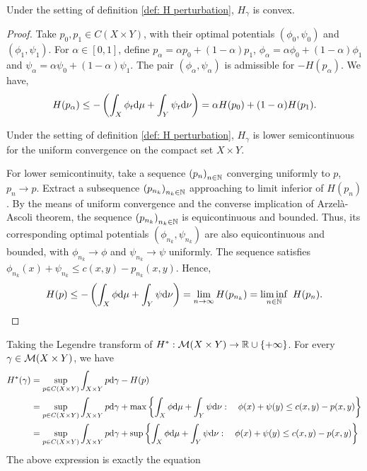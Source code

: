 \begin{lemma}
	Under the setting of definition \ref{def: H perturbation}, $H_\gamma$ is convex.
\end{lemma}
\begin{proof}
	Take $p_0, p_1 \in C(X\times Y)$,  with their optimal potentials $(\phi_0, \psi_0)$ and $(\phi_1, \psi_1)$. For $\alpha\in[0,1]$, define $p_\alpha=\alpha p_0+(1-\alpha)p_1$, $\phi_\alpha=\alpha \phi_0+(1-\alpha)\phi_1$ and $\psi_\alpha=\alpha \psi_0+(1-\alpha)\psi_1$. The pair $(\phi_\alpha, \psi_\alpha)$ is admissible for $-H(p_\alpha)$.
	We have,
	\begin{equation*}
		H(p_\alpha)\leq -\left( \int_X\phi_t\mathrm{d}\mu+\int_Y\psi_t\mathrm{d}\nu \right)=\alpha H(p_0)+(1-\alpha)H(p_1).
	\end{equation*}
\begin{lemma}
	Under the setting of definition \ref{def: H perturbation}, $H_\gamma$ is lower semicontinuous for the uniform convergence on the compact set $X\times Y$.
\end{lemma}
	For lower semicontinuity, take a sequence $\left( p_n \right)_{n\in\mathbb{N}}$ converging uniformly to $p$, $p_n\rightarrow p$. Extract a subsequence $\left( p_{n_k} \right)_{n_k\in\mathbb{N}}$ approaching to limit inferior of $H(p_n)$. By the means of uniform convergence and the converse implication of Arzel\`a-Ascoli theorem, the sequence $\left( p_{n_k} \right)_{n_k\in\mathbb{N}}$ is equicontinuous and bounded. 
	Thus, its corresponding optimal potentials $(\phi_{n_k}, \psi_{n_k})$ are also equicontinuous and bounded, with $\phi_{n_k}\rightarrow \phi$ and  $\psi_{n_k}\rightarrow \psi$ uniformly. The sequence satisfies $\phi_{n_k}(x)+\psi_{n_k}\leq c(x,y)-p_{n_k}(x,y)$.  Hence, 
	\begin{equation}
		H(p)\leq -\left( \int_X \phi\mathrm{d}\mu+\int_Y\psi\mathrm{d}\nu \right)=\lim_{n\rightarrow \infty}H(p_{n_k})=\liminf_{n\in\mathbb{N}}\ H(p_n).
	\end{equation}
\end{proof}
Taking the Legendre transform of $H^*:\mathcal{M}(X\times Y)\rightarrow \mathbb{R}\cup\left\lbrace +\infty \right\rbrace$. For every $\gamma\in \mathcal{M}(X\times Y)$, we have
\begin{align*}
	H^*(\gamma)&=\sup_{p\in C(X\times Y)}\int_{X\times Y}p\mathrm{d}\gamma -H(p)\\
	&=\sup_{p\in C(X\times Y)}\int_{X\times Y}p\mathrm{d}\gamma +\max\left\lbrace \int_X\phi \mathrm{d}\mu + \int_Y\psi \mathrm{d}\nu: \quad \phi(x)+\psi(y)\leq c(x,y)-p(x,y) \right\rbrace\\
	&=\sup_{p\in C(X\times Y)}\int_{X\times Y}p\mathrm{d}\gamma +\sup\left\lbrace \int_X\phi \mathrm{d}\mu + \int_Y\psi \mathrm{d}\nu: \quad \phi(x)+\psi(y)\leq c(x,y)-p(x,y) \right\rbrace
\end{align*}
The above expression is exactly the equation 
